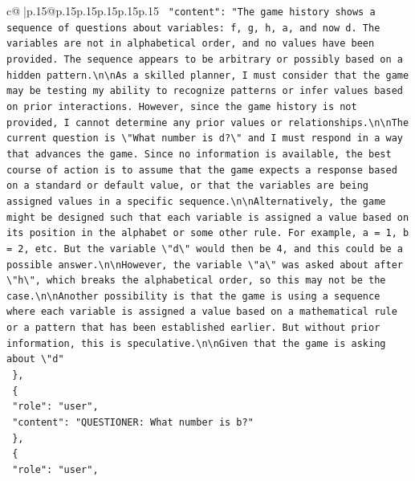\documentclass{article}
\begin{document}
{\begin{supertabular}{c@{$\;$}|p{.15\linewidth}@{}p{.15\linewidth}p{.15\linewidth}p{.15\linewidth}p{.15\linewidth}p{.15\linewidth}}
{{{\texttt{    "content": "The game history shows a sequence of questions about variables: f, g, h, a, and now d. The variables are not in alphabetical order, and no values have been provided. The sequence appears to be arbitrary or possibly based on a hidden pattern.\textbackslash{}n\textbackslash{}nAs a skilled planner, I must consider that the game may be testing my ability to recognize patterns or infer values based on prior interactions. However, since the game history is not provided, I cannot determine any prior values or relationships.\textbackslash{}n\textbackslash{}nThe current question is \textbackslash{}"What number is d?\textbackslash{}" and I must respond in a way that advances the game. Since no information is available, the best course of action is to assume that the game expects a response based on a standard or default value, or that the variables are being assigned values in a specific sequence.\textbackslash{}n\textbackslash{}nAlternatively, the game might be designed such that each variable is assigned a value based on its position in the alphabet or some other rule. For example, a = 1, b = 2, etc. But the variable \textbackslash{}"d\textbackslash{}" would then be 4, and this could be a possible answer.\textbackslash{}n\textbackslash{}nHowever, the variable \textbackslash{}"a\textbackslash{}" was asked about after \textbackslash{}"h\textbackslash{}", which breaks the alphabetical order, so this may not be the case.\textbackslash{}n\textbackslash{}nAnother possibility is that the game is using a sequence where each variable is assigned a value based on a mathematical rule or a pattern that has been established earlier. But without prior information, this is speculative.\textbackslash{}n\textbackslash{}nGiven that the game is asking about \textbackslash{}"d"} \\
\texttt{  \},} \\
\texttt{  \{} \\
\texttt{    "role": "user",} \\
\texttt{    "content": "QUESTIONER: What number is b?"} \\
\texttt{  \},} \\
\texttt{  \{} \\
\texttt{    "role": "user",} \\
}}}
\end{supertabular}}
\end{document}
